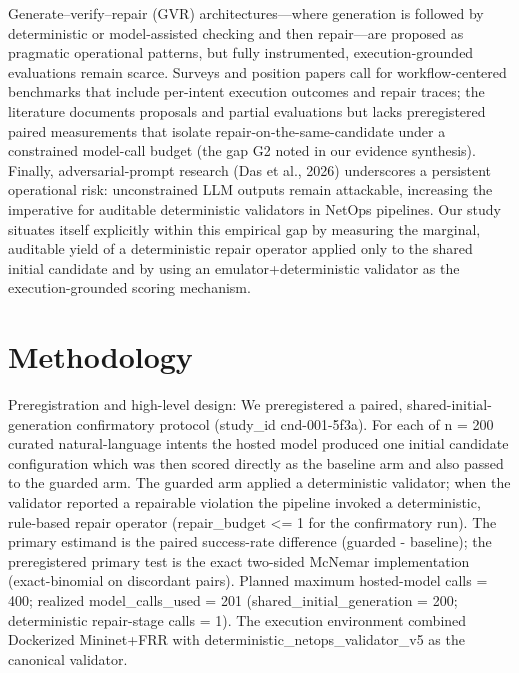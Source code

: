 \documentclass[conference]{IEEEtran}
\begin{document}
Generate--verify--repair (GVR) architectures---where generation is followed by deterministic or model-assisted checking and then repair---are proposed as pragmatic operational patterns, but fully instrumented, execution-grounded evaluations remain scarce. Surveys and position papers call for workflow-centered benchmarks that include per-intent execution outcomes and repair traces; the literature documents proposals and partial evaluations but lacks preregistered paired measurements that isolate repair-on-the-same-candidate under a constrained model-call budget (the gap G2 noted in our evidence synthesis). Finally, adversarial-prompt research (Das et al., 2026) underscores a persistent operational risk: unconstrained LLM outputs remain attackable, increasing the imperative for auditable deterministic validators in NetOps pipelines. Our study situates itself explicitly within this empirical gap by measuring the marginal, auditable yield of a deterministic repair operator applied only to the shared initial candidate and by using an emulator+deterministic validator as the execution-grounded scoring mechanism.

\section{Methodology}
Preregistration and high-level design: We preregistered a paired, shared-initial-generation confirmatory protocol (study\_id cnd-001-5f3a). For each of n = 200 curated natural-language intents the hosted model produced one initial candidate configuration which was then scored directly as the baseline arm and also passed to the guarded arm. The guarded arm applied a deterministic validator; when the validator reported a repairable violation the pipeline invoked a deterministic, rule-based repair operator (repair\_budget <= 1 for the confirmatory run). The primary estimand is the paired success-rate difference (guarded - baseline); the preregistered primary test is the exact two-sided McNemar implementation (exact-binomial on discordant pairs). Planned maximum hosted-model calls = 400; realized model\_calls\_used = 201 (shared\_initial\_generation = 200; deterministic repair-stage calls = 1). The execution environment combined Dockerized Mininet+FRR with deterministic\_netops\_validator\_v5 as the canonical validator.
\end{document}
